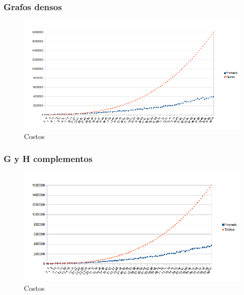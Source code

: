 \subsubsection{Grafos densos}

\begin{figure}[H]
	\centering
	\includegraphics[scale=0.8]{goloso-tiempos-G-y-H-densos.png}
\caption{Costos}
\end{figure}

\subsubsection{G y H complementos}

\begin{figure}[H]
	\centering
	\includegraphics[scale=0.8]{goloso-tiempos-H-complemento.png}
\caption{Costos}
\end{figure}